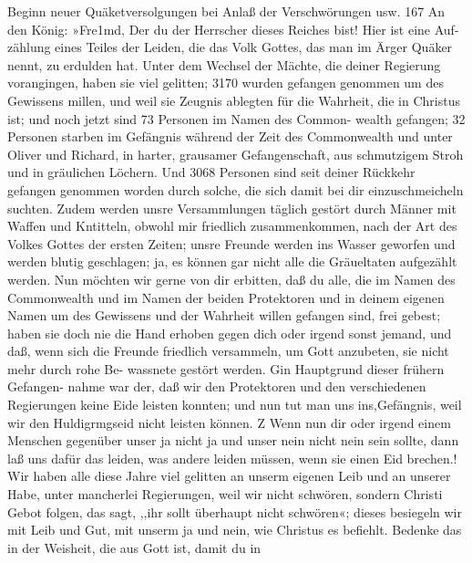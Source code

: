 Beginn neuer Quäketversolgungen bei Anlaß der Verschwörungen usw. 167
An den König:
»Fre1md,
Der du der Herrscher dieses Reiches bist! Hier ist eine Auf-
zählung eines Teiles der Leiden, die das Volk Gottes, das man
im Ärger Quäker nennt, zu erdulden hat. Unter dem Wechsel
der Mächte, die deiner Regierung vorangingen, haben sie viel
gelitten; 3170 wurden gefangen genommen um des Gewissens
millen, und weil sie Zeugnis ablegten für die Wahrheit, die in
Christus ist; und noch jetzt sind 73 Personen im Namen des Common-
wealth gefangen; 32 Personen starben im Gefängnis während
der Zeit des Commonwealth und unter Oliver und Richard, in
harter, grausamer Gefangenschaft, aus schmutzigem Stroh und in
gräulichen Löchern. Und 3068 Personen sind seit deiner Rückkehr
gefangen genommen worden durch solche, die sich damit bei dir
einzuschmeicheln suchten. Zudem werden unsre Versammlungen
täglich gestört durch Männer mit Waffen und Kntitteln, obwohl
mir friedlich zusammenkommen, nach der Art des Volkes Gottes
der ersten Zeiten; unsre Freunde werden ins Wasser geworfen
und werden blutig geschlagen; ja, es können gar nicht alle die
Gräueltaten aufgezählt werden. Nun möchten wir gerne von dir
erbitten, daß du alle, die im Namen des Commonwealth und im
Namen der beiden Protektoren und in deinem eigenen Namen
um des Gewissens und der Wahrheit willen gefangen sind, frei
gebest; haben sie doch nie die Hand erhoben gegen dich oder
irgend sonst jemand, und daß, wenn sich die Freunde friedlich
versammeln, um Gott anzubeten, sie nicht mehr durch rohe Be-
wassnete gestört werden. Gin Hauptgrund dieser frühern Gefangen-
nahme war der, daß wir den Protektoren und den verschiedenen
Regierungen keine Eide leisten konnten; und nun tut man uns
ins,Gefängnis, weil wir den Huldigrmgseid nicht leisten können.
Z Wenn nun dir oder irgend einem Menschen gegenüber unser
ja nicht ja und unser nein nicht nein sein sollte, dann laß uns
dafür das leiden, was andere leiden müssen, wenn sie einen Eid
brechen.! Wir haben alle diese Jahre viel gelitten an unserm
eigenen Leib und an unserer Habe, unter mancherlei Regierungen,
weil wir nicht schwören, sondern Christi Gebot folgen, das sagt,
,,ihr sollt überhaupt nicht schwören«; dieses besiegeln wir mit Leib
und Gut, mit unserm ja und nein, wie Christus es befiehlt.
Bedenke das in der Weisheit, die aus Gott ist, damit du in




